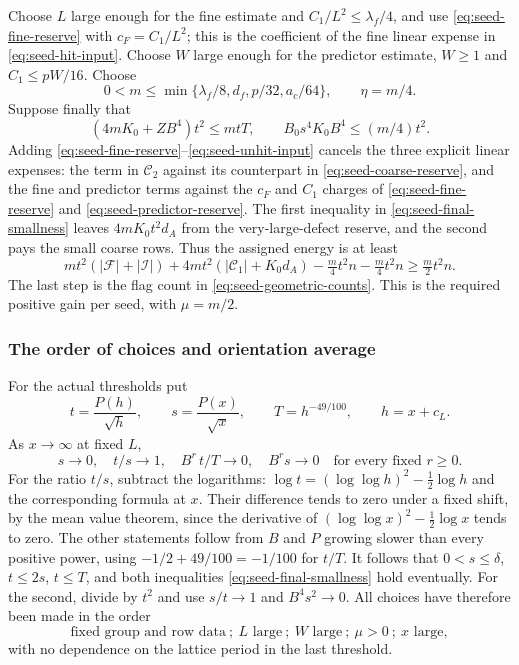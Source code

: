 Choose $L$ large enough for the fine estimate and
$C_1/L^2\le\lambda_f/4$, and use \eqref{eq:seed-fine-reserve} with
$c_F=C_1/L^2$; this is the coefficient of the fine linear expense in
\eqref{eq:seed-hit-input}. Choose $W$ large enough for the predictor
estimate, $W\ge1$ and $C_1\le pW/16$. Choose
\[
 0<m\le\min\{\lambda_f/8,d_f,p/32,a_c/64\},\qquad \eta=m/4.
\]
Suppose finally that
\begin{equation}\label{eq:seed-final-smallness}
 (4mK_0+ZB^4)t^2\le mtT,
 \qquad B_0s^4K_0B^4\le(m/4)t^2.
\end{equation}
Adding \eqref{eq:seed-fine-reserve}--\eqref{eq:seed-unhit-input}
cancels the three explicit linear expenses: the term in $\mathcal C_2$
against its counterpart in \eqref{eq:seed-coarse-reserve}, and the fine
and predictor terms against the $c_F$ and $C_1$ charges of
\eqref{eq:seed-fine-reserve} and \eqref{eq:seed-predictor-reserve}. The first inequality in
\eqref{eq:seed-final-smallness} leaves $4mK_0t^2d_A$ from the
very-large-defect reserve, and the second pays the small coarse rows.
Thus the assigned energy is at least
\[
 mt^2(|\mathcal F|+|\mathcal I|)
 +4mt^2(|\mathcal C_1|+K_0d_A)-\tfrac m4t^2n-\tfrac m4t^2n
 \ge\tfrac m2t^2n.
\]
The last step is the flag count in \eqref{eq:seed-geometric-counts}.
This is the required positive gain per seed, with $\mu=m/2$.

\subsubsection{The order of choices and orientation average}
For the actual thresholds put
\[
 t=\frac{P(h)}{\sqrt h},\qquad
 s=\frac{P(x)}{\sqrt x},\qquad
 T=h^{-49/100},\qquad h=x+c_L.
\]
As $x\to\infty$ at fixed $L$,
\[
 s\to0,\quad t/s\to1,\quad
 B^r\,t/T\to0,\quad B^r s\to0
 \quad\text{for every fixed }r\ge0.
\]
For the ratio $t/s$, subtract the logarithms:
$\log t=(\log\log h)^2-\frac12\log h$ and the corresponding formula
at $x$. Their difference tends to zero under a fixed shift, by the
mean value theorem, since the derivative of
$(\log\log x)^2-\frac12\log x$ tends to zero. The other statements
follow from $B$ and $P$ growing slower than every positive power,
using $-1/2+49/100=-1/100$ for $t/T$.
It follows that $0<s\le\delta$, $t\le2s$, $t\le T$, and both
inequalities \eqref{eq:seed-final-smallness} hold eventually. For the
second, divide by $t^2$ and use $s/t\to1$ and $B^4s^2\to0$.
All choices have therefore been made in the order
\[
 \text{fixed group and row data}\ ;\ L\text{ large}\ ;\
 W\text{ large}\ ;\ \mu>0\ ;\ x\text{ large},
\]
with no dependence on the lattice period in the last threshold.

